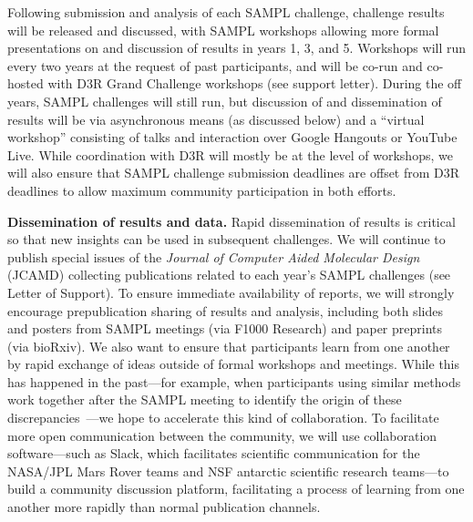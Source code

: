 \documentclass[11pt]{article}
\begin{document}
Following submission and analysis of each SAMPL challenge, challenge results will be released and discussed, with SAMPL workshops allowing more formal presentations on and discussion of results in years 1, 3, and 5. 
Workshops will run every two years at the request of past participants, and will be co-run and co-hosted with D3R Grand Challenge workshops (see support letter).
During the off years, SAMPL challenges will still run, but discussion of and dissemination of results will be via asynchronous means (as discussed below) and a ``virtual workshop'' consisting of talks and interaction over Google Hangouts or YouTube Live.
While coordination with D3R will mostly be at the level of workshops, we will also ensure that SAMPL challenge submission deadlines are offset from D3R deadlines to allow maximum community participation in both efforts.

{\bf Dissemination of results and data.}
Rapid dissemination of results is critical so that new insights can be used in subsequent challenges.
We will continue to publish special issues of the \emph{Journal of Computer Aided Molecular Design} (JCAMD) collecting publications related to each year's SAMPL challenges (see Letter of Support).
To ensure immediate availability of reports, we will strongly encourage prepublication sharing of results and analysis, including both slides and posters from SAMPL meetings (via F1000 Research) and paper preprints (via bioRxiv).
We also want to ensure that participants learn from one another by rapid exchange of ideas outside of formal workshops and meetings.
While this has happened in the past---for example, when participants using similar methods work together after the SAMPL meeting to identify the origin of these discrepancies~\cite{monroe_converging_2014, yin_overview_2016, bhakat_resolving_2016, bosisio_blinded_2016, mobley_predicting_2016}---we hope to accelerate this kind of collaboration.
To facilitate more open communication between the community, we will use collaboration software---such as Slack, which facilitates scientific communication for the NASA/JPL Mars Rover teams and NSF antarctic scientific research teams---to build a community discussion platform, 
facilitating a process of learning from one another more rapidly than normal publication channels.
\end{document}
